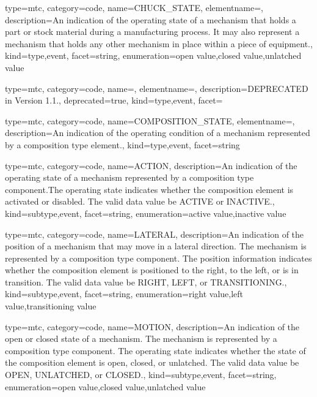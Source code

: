 {
  type=mtc,
  category=code,
  name={CHUCK\_STATE},
  elementname=,
  description={An indication of the operating state of a mechanism that holds a part or stock material during a manufacturing process. It may also represent a mechanism that holds any other mechanism in place within a piece of equipment.},
  kind={type,event},
  facet={\gls{string}},
  enumeration={\gls{open value},\gls{closed value},\gls{unlatched value}}
}


{
  type=mtc,
  category=code,
  name=,
  elementname=,
  description={DEPRECATED in Version 1.1.},
  deprecated={true},
  kind={type,event},
  facet={}
}


{
  type=mtc,
  category=code,
  name={COMPOSITION\_STATE},
  elementname=,
  description={An indication of the operating condition of a mechanism represented by a \gls{composition} type element.},
  kind={type,event},
  facet={\gls{string}}
}


{
  type=mtc,
  category=code,
  name={ACTION},
  description={An indication of the operating state of a mechanism represented by a \gls{composition} type component.The operating state indicates whether the \gls{composition} element is activated or disabled. The \gls{valid data value} \must be ACTIVE or INACTIVE.},
  kind={subtype,event},
  facet={\gls{string}},
  enumeration={\gls{active value},\gls{inactive value}}
}


{
  type=mtc,
  category=code,
  name={LATERAL},
  description={An indication of the position of a mechanism that may move in a lateral direction.   The mechanism is represented by a \gls{composition} type component. \newline The position information indicates whether the \gls{composition} element is positioned to the right, to the left, or is in transition.  \newline The \gls{valid data value} \must be RIGHT, LEFT, or TRANSITIONING.},
  kind={subtype,event},
  facet={\gls{string}},
  enumeration={\gls{right value},\gls{left value},\gls{transitioning value}}
}


{
  type=mtc,
  category=code,
  name={MOTION},
  description={An indication of the open or closed state of a mechanism.   The mechanism is represented by a \gls{composition} type component. \newline The operating state indicates whether the state of the \gls{composition} element is open, closed, or unlatched.   \newline The \gls{valid data value} \must be OPEN, UNLATCHED, or CLOSED.},
  kind={subtype,event},
  facet={\gls{string}},
  enumeration={\gls{open value},\gls{closed value},\gls{unlatched value}}
}


